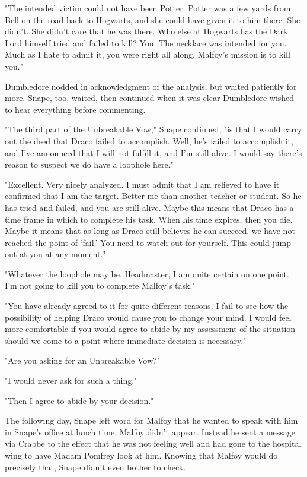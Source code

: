 \documentclass[a4paper,11pt]{article}
\begin{document}
"The intended victim could not have been Potter. Potter was a few yards from Bell on the road back to Hogwarts, and she could have given it to him there. She didn't. She didn't care that he was there. Who else at Hogwarts has the Dark Lord himself tried and failed to kill? You. The necklace was intended for you. Much as I hate to admit it, you were right all along. Malfoy's mission is to kill you."

Dumbledore nodded in acknowledgment of the analysis, but waited patiently for more. Snape, too, waited, then continued when it was clear Dumbledore wished to hear everything before commenting.

"The third part of the Unbreakable Vow," Snape continued, "is that I would carry out the deed that Draco failed to accomplish. Well, he's failed to accomplish it, and I've announced that I will not fulfill it, and I'm still alive. I would say there's reason to suspect we do have a loophole here."

"Excellent. Very nicely analyzed. I must admit that I am relieved to have it confirmed that I am the target. Better me than another teacher or student. So he has tried and failed, and you are still alive. Maybe this means that Draco has a time frame in which to complete his task. When his time expires, then you die. Maybe it means that as long as Draco still believes he can succeed, we have not reached the point of `fail.' You need to watch out for yourself. This could jump out at you at any moment."

"Whatever the loophole may be, Headmaster, I am quite certain on one point. I'm not going to kill you to complete Malfoy's task."

"You have already agreed to it for quite different reasons. I fail to see how the possibility of helping Draco would cause you to change your mind. I would feel more comfortable if you would agree to abide by my assessment of the situation should we come to a point where immediate decision is necessary."

"Are you asking for an Unbreakable Vow?"

"I would never ask for such a thing."

"Then I agree to abide by your decision."

The following day, Snape left word for Malfoy that he wanted to speak with him in Snape's office at lunch time. Malfoy didn't appear. Instead he sent a message via Crabbe to the effect that he was not feeling well and had gone to the hospital wing to have Madam Pomfrey look at him. Knowing that Malfoy would do precisely that, Snape didn't even bother to check.
\end{document}

